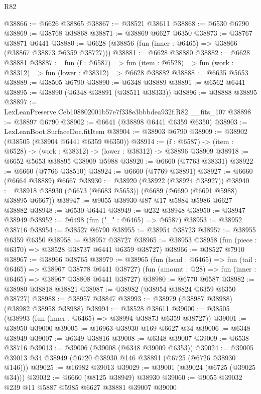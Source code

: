 \begin{lexlean}{R82}
\begin{coremodule}
@38866 := @6626 @38865
@38867 := @38521 @38611
@38868 := @6530 @6790
@38869 := @38768 @38868
@38871 := @38869 @6627 @6350
@38873 := @38767 @38871 @6441
@38880 := @6628 (@38856 (fun (inner : @6465) => @38866 (@38867 @38873 @6359 @38727)))
@38881 := @6628 @38880
@38882 := @6628 @38881
@38887 := fun (f : @6587) =>
  fun (item : @6528) => fun (work : @38312) => fun (lower : @38312) => @6628 @38882
@38888 := @6635 @5653
@38889 := @38505 @6790
@38890 := @6348 @38889
@38891 := @6562 @6441
@38895 := @38890 (@6348 @38891 (@38511 @38333))
@38896 := @38888 @38895
@38897 := LexLeanPreserve.Ceb108802001b57e7f338e3bbbdea932f.R82.__fits_107
@38898 := @38897 @6790
@38902 := @6641 (@38898 @6441 @6359 @6350)
@38903 := LexLeanBoot.SurfaceDoc.fitItem
@38904 := @38903 @6790
@38909 := @38902 (@38505 (@38904 @6441 @6359 @6350))
@38914 := (f : @6587) -> (item : @6528) -> (work : @38312) -> (lower : @38312) -> @38896 @38909
@38918 := @6652 @5653 @38895 @38909 @5988
@38920 := @6660 (@7763 @38331)
@38922 := @6660 (@7766 @38510)
@38924 := @6660 (@7769 @38891)
@38927 := @6660 (@6664 @38889) @6667
@38930 := @38920 (@38922 (@38924 @38927))
@38940 := @38918 @38930 (@6673 (@6683 @5653)) (@6689 (@6690 (@6691 @5988) @38895 @6667))
@38947 := @9055 @38930 @87 @17 @5884 @5986 @6627 @38882
@38948 := @6530 @6441
@38949 := @232 @38948
@38950 := @38947 @38949
@38952 := @6498 (fun ("_" : @6465) => @6587)
@38953 := @38952 @38716
@38954 := @38527 @6790
@38955 := @38954 @38723
@38957 := @38955 @6359 @6350
@38958 := @38957 @38727
@38965 := @38953 @38958 (fun (piece : @6370) => @38528 @38737 @6441 @6359 @38727)
@38966 := @38527 @7910
@38967 := @38966 @38765
@38979 := @38965
    (fun (head : @6465) => fun (tail : @6465) => @38967 @38778 @6441 @38727)
    (fun (amount : @28) => fun (inner : @6465) => @38967 @38808 @6441 @38727)
@38980 := @6770 @6587
@38982 := @38980 @38818 @38821
@38987 := @38982 (@38954 @38824 @6359 @6350 @38727)
@38988 := @38957 @38847
@38993 := @38979 (@38987 @38988) (@38982 @38958 @38988)
@38994 := @38528 @38611
@39000 := @38505 (@38993 (fun (inner : @6465) => @38994 @38873 @6359 @38727))
@39001 := @38950 @39000
@39005 := @16963 @38930 @169 @6627 @34
@39006 := @6348 @38949
@39007 := @6349 @38816
@39008 := @6348 @39007
@39009 := @6538 @38716
@39013 := @39006 (@39008 (@6348 @39009 @6353))
@39024 := @39005 @39013 @34 @38949 (@6720 @38930 @146 @38891 (@6725 (@6726 @38930 @146)))
@39025 := @16982 @39013
@39029 := @39001 (@39024 (@6725 (@39025 @34)))
@39032 := @6660 (@8125 @38949) @38930
@39060 := @9055
    @39032
    @239
    @11
    @5887
    @5985
    @6627
    @38881
    @39007
    @39000

\end{coremodule}
\end{lexlean}
